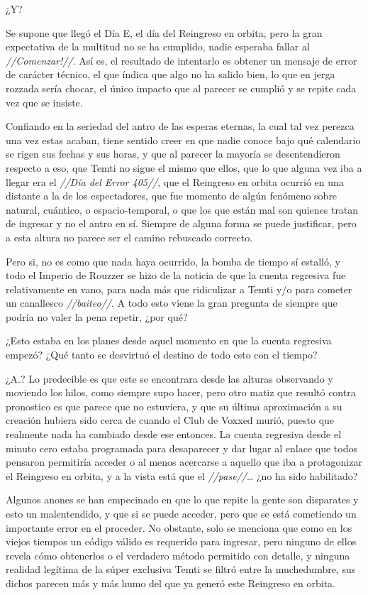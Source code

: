 \documentclass[
  spanish,
]{book}
\begin{document}
¿Y?

Se supone que llegó el Día E, el día del Reingreso en orbita, pero la gran expectativa de la multitud no se ha cumplido, nadie esperaba fallar al \emph{//Comenzar!//}.
Así es, el resultado de intentarlo es obtener un mensaje de error de carácter técnico, el que índica que algo no ha salido bien, lo que en jerga rozzada sería chocar, el único impacto que al parecer se cumplió y se repite cada vez que se insiste.

Confiando en la seriedad del antro de las esperas eternas, la cual tal vez perezca una vez estas acaban, tiene sentido creer en que nadie conoce bajo qué calendario se rigen sus fechas y sus horas, y que al parecer la mayoría se desentendieron respecto a eso, que Temti no sigue el mismo que ellos, que lo que alguna vez iba a llegar era el \emph{//Día del Error 405//}, que el Reingreso en orbita ocurrió en una distante a la de los espectadores, que fue momento de algún fenómeno sobre natural, cuántico, o espacio-temporal, o que los que están mal son quienes tratan de ingresar y no el antro en sí. Siempre de alguna forma se puede justificar, pero a esta altura no parece ser el camino rebuscado correcto.

Pero si, no es como que nada haya ocurrido, la bomba de tiempo sí estalló, y todo el Imperio de Rouzzer se hizo de la noticia de que la cuenta regresiva fue relativamente en vano, para nada más que ridiculizar a Temti y/o para cometer un canallesco \emph{//baiteo//}. A todo esto viene la gran pregunta de siempre que podría no valer la pena repetir, ¿por qué?

¿Esto estaba en los planes desde aquel momento en que la cuenta regresiva empezó? ¿Qué tanto se desvirtuó el destino de todo esto con el tiempo?

¿A.?
Lo predecible es que este se encontrara desde las alturas observando y moviendo los hilos, como siempre supo hacer, pero otro matiz que resultó contra pronostico es que parece que no estuviera, y que su última aproximación a su creación hubiera sido cerca de cuando el Club de Voxxed murió, puesto que realmente nada ha cambiado desde ese entonces.
La cuenta regresiva desde el minuto cero estaba programada para desaparecer y dar lugar al enlace que todos pensaron permitiría acceder o al menos acercarse a aquello que iba a protagonizar el Reingreso en orbita, y a la vista está que el \emph{//pase//}\ldots{} ¿no ha sido habilitado?

Algunos anones se han empecinado en que lo que repite la gente son disparates y esto un malentendido, y que si se puede acceder, pero que se está cometiendo un importante error en el proceder. No obstante, solo se menciona que como en los viejos tiempos un código válido es requerido para ingresar, pero ninguno de ellos revela cómo obtenerlos o el verdadero método permitido con detalle, y ninguna realidad legítima de la súper exclusiva Temti se filtró entre la muchedumbre, sus dichos parecen más y más humo del que ya generó este Reingreso en orbita.
\end{document}
